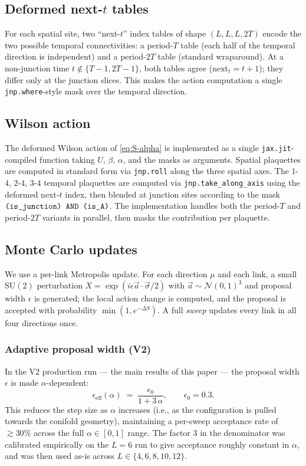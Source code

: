 \documentclass[11pt,a4paper]{article}
\theoremstyle{definition}
\newcommand{\SUtwo}{\mathrm{SU}(2)}
\begin{document}
\subsection{Deformed next-$t$ tables}

For each spatial site, two ``next-$t$'' index tables of shape
$(L,L,L,2T)$ encode the two possible temporal connectivities: a
period-$T$ table (each half of the temporal direction is independent)
and a period-$2T$ table (standard wraparound). At a non-junction time
$t \notin \{T-1, 2T-1\}$, both tables agree
($\mathrm{next}_t = t+1$); they differ only at the junction
slices. This makes the action computation a single
\verb|jnp.where|-style mask over the temporal direction.

\subsection{Wilson action}

The deformed Wilson action of \eqref{eq:S-alpha} is implemented as a
single \verb|jax.jit|-compiled function taking $U$, $\beta$, $\alpha$,
and the masks as arguments. Spatial plaquettes are computed in
standard form via \verb|jnp.roll| along the three spatial axes. The
$1$-$4$, $2$-$4$, $3$-$4$ temporal plaquettes are computed via
\verb|jnp.take_along_axis| using the deformed next-$t$ index, then
blended at junction sites according to the mask
$\verb|(is_junction) AND (is_A)|$. The implementation handles both
the period-$T$ and period-$2T$ variants in parallel, then masks the
contribution per plaquette.

\subsection{Monte Carlo updates}

We use a per-link Metropolis update. For each direction $\mu$ and
each link, a small $\SUtwo$ perturbation $X = \exp(i \epsilon \vec a
\cdot \vec\sigma /2)$ with $\vec a \sim \mathcal N(0,1)^{3}$ and
proposal width $\epsilon$ is generated; the local action change is
computed, and the proposal is accepted with probability $\min(1,
e^{-\Delta S})$. A full \emph{sweep} updates every link in all four
directions once.

\subsubsection{Adaptive proposal width (V2)}

In the V2 production run --- the main results of this paper --- the
proposal width $\epsilon$ is made $\alpha$-dependent:
\begin{equation}
  \epsilon_{\mathrm{eff}}(\alpha) \;=\; \frac{\epsilon_0}{1 + 3\,\alpha},
  \qquad \epsilon_0 = 0.3.
  \label{eq:eps-adaptive}
\end{equation}
This reduces the step size as $\alpha$ increases (i.e., as the
configuration is pulled towards the conifold geometry), maintaining a
per-sweep acceptance rate of $\gtrsim 30\%$ across the full
$\alpha \in [0,1]$ range. The factor $3$ in the denominator was
calibrated empirically on the $L = 6$ run to give acceptance roughly
constant in $\alpha$, and was then used as-is across $L \in \{4, 6,
8, 10, 12\}$.
\end{document}
